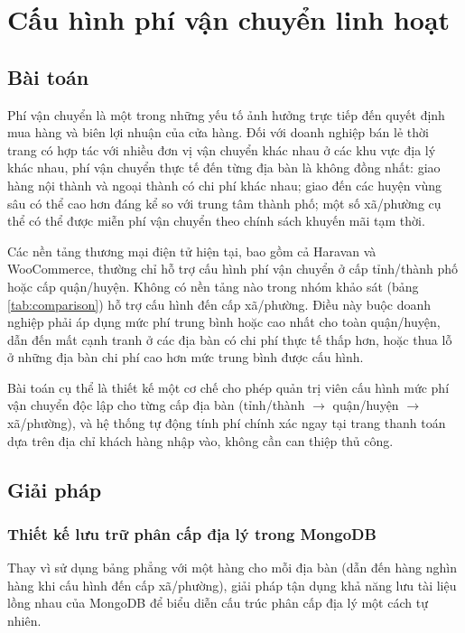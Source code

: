 \documentclass[../DoAn.tex]{subfiles}
\begin{document}
\section{Cấu hình phí vận chuyển linh hoạt}
\label{section:5.3}

\subsection{Bài toán}
\label{subsection:5.3.1}

Phí vận chuyển là một trong những yếu tố ảnh hưởng trực tiếp đến quyết định
mua hàng và biên lợi nhuận của cửa hàng. Đối với doanh nghiệp bán lẻ thời
trang có hợp tác với nhiều đơn vị vận chuyển khác nhau ở các khu vực địa lý
khác nhau, phí vận chuyển thực tế đến từng địa bàn là không đồng nhất: giao
hàng nội thành và ngoại thành có chi phí khác nhau; giao đến các huyện vùng
sâu có thể cao hơn đáng kể so với trung tâm thành phố; một số xã/phường cụ
thể có thể được miễn phí vận chuyển theo chính sách khuyến mãi tạm thời.

Các nền tảng thương mại điện tử hiện tại, bao gồm cả Haravan và \break WooCommerce,
thường chỉ hỗ trợ cấu hình phí vận chuyển ở cấp tỉnh/thành phố hoặc cấp
quận/huyện. Không có nền tảng nào trong nhóm khảo sát (bảng
\ref{tab:comparison}) hỗ trợ cấu hình đến cấp xã/phường. Điều này buộc doanh
nghiệp phải áp dụng mức phí trung bình hoặc cao nhất cho toàn quận/huyện, dẫn
đến mất cạnh tranh ở các địa bàn có chi phí thực tế thấp hơn, hoặc thua lỗ ở
những địa bàn chi phí cao hơn mức trung bình được cấu hình.

Bài toán cụ thể là thiết kế một cơ chế cho phép quản trị viên cấu hình mức
phí vận chuyển độc lập cho từng cấp địa bàn (tỉnh/thành $\to$ quận/huyện $\to$
xã/phường), và hệ thống tự động tính phí chính xác ngay tại trang thanh toán
dựa trên địa chỉ khách hàng nhập vào, không cần can thiệp thủ công.

\subsection{Giải pháp}
\label{subsection:5.3.2}

\subsubsection*{Thiết kế lưu trữ phân cấp địa lý trong MongoDB}

Thay vì sử dụng bảng phẳng với một hàng cho mỗi địa bàn (dẫn đến hàng nghìn
hàng khi cấu hình đến cấp xã/phường), giải pháp tận dụng khả năng lưu tài
liệu lồng nhau của MongoDB để biểu diễn cấu trúc phân cấp địa lý một cách
tự nhiên.
\end{document}
